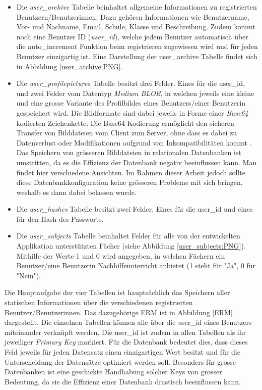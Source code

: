 \documentclass[../main.tex]{subfiles}
\begin{document}
	\begin{itemize}
		\item Die \emph{user\_archive} Tabelle beinhaltet allgemeine Informationen zu registrierten Benutzern/Benutzerinnen. Dazu gehören Informationen wie Benutzername, Vor- und Nachname, Email, Schule, Klasse und Beschreibung. Zudem kommt noch eine Benutzer ID (\emph{user\_id}), welche jedem Benutzer automatisch über die auto\_increment Funktion beim registrieren zugewiesen wird und für jeden Benutzer einzigartig ist. Eine Darstellung der user\_archive Tabelle findet sich in Abbildung \ref{user_archive:PNG}.
		\item Die \emph{user\_profilepictures} Tabelle besitzt drei Felder. Eines für die user\_id, und zwei Felder vom Datentyp \emph{Medium BLOB}, in welchen jeweils eine kleine und eine grosse Variante des Profilbildes eines Benutzers/einer Benutzerin gespeichert wird. Die Bildformate sind dabei jeweils in Forme einer \emph{Base64} kodierten Zeichenkette. Die Base64 Kodierung ermöglicht den sicheren Transfer von Bilddateien vom Client zum Server, ohne dass es dabei zu Datenverlust oder Modifikationen aufgrund von Inkompatibilitäten kommt \cite{base64}. Das Speichern von grösseren Bilddateien in relationalen Datenbanken ist umstritten, da es die Effizienz der Datenbank negativ beeinflussen kann. Man findet hier verschiedene Ansichten. Im Rahmen dieser Arbeit jedoch sollte diese Datenbankkonfiguration keine grösseren Probleme mit sich bringen, weshalb es dann dabei belassen wurde.
		\item Die \emph{user\_hashes} Tabelle besitzt zwei Felder. Eines für die user\_id und eines für den Hash des Passworts.
		\item Die \emph{user\_subjects} Tabelle beinhaltet Felder für alle von der entwickelten Applikation unterstützten Fächer (siehe Abbildung \ref{user_subjects:PNG}). Mithilfe der Werte 1 und 0 wird angegeben, in welchen Fächern ein Benutzer/eine Benutzerin Nachhilfeunterricht anbietet (1 steht für "Ja", 0 für "Nein").
	\end{itemize}
	
	 Die Hauptaufgabe der vier Tabellen ist hauptsächlich das Speichern aller statischen Informationen über die verschiedenen registrierten Benutzer/Benutzerinnen. Das dazugehörige ERM ist in Abbildung \ref{ERM} dargestellt. Die einzelnen Tabellen können alle über die user\_id eines Benutzers miteinander verknüpft werden. Die user\_id ist zudem in allen Tabellen als ihr jeweiliger \emph{Primary Key} markiert. Für die Datenbank bedeutet dies, dass dieses Feld jeweils für jeden Datensatz einen einzigartigen Wert besitzt und für die Unterscheidung der Datensätze optimiert werden soll. Besonders für grosse Datenbanken ist eine geschickte Handhabung solcher Keys von grosser Bedeutung, da sie die Effizienz einer Datenbank drastisch beeinflussen kann.
	
\end{document}
